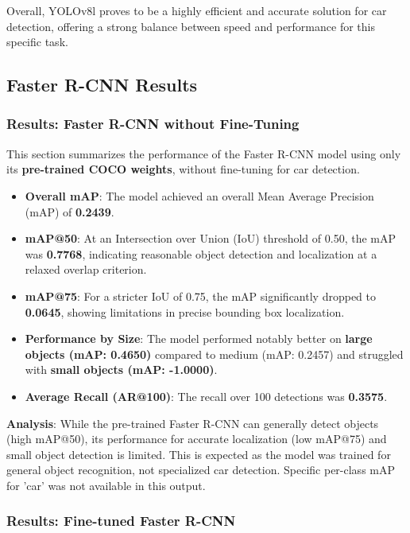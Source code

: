 \documentclass[conference]{IEEEtran}
\begin{document}
Overall, YOLOv8l proves to be a highly efficient and accurate solution for car detection, offering a strong balance between speed and performance for this specific task.

\subsection{Faster R-CNN Results}
\label{ssec:fasterrcnn_results_overall} 

\subsubsection{Results: Faster R-CNN without Fine-Tuning}
\label{ssec:results_fasterrcnn_pretrained}

This section summarizes the performance of the Faster R-CNN model using only its \textbf{pre-trained COCO weights}, without fine-tuning for car detection.

\begin{itemize}
    \item \textbf{Overall mAP}: The model achieved an overall Mean Average Precision (mAP) of \textbf{0.2439}.
    \item \textbf{mAP@50}: At an Intersection over Union (IoU) threshold of 0.50, the mAP was \textbf{0.7768}, indicating reasonable object detection and localization at a relaxed overlap criterion.
    \item \textbf{mAP@75}: For a stricter IoU of 0.75, the mAP significantly dropped to \textbf{0.0645}, showing limitations in precise bounding box localization.
    \item \textbf{Performance by Size}: The model performed notably better on \textbf{large objects (mAP: 0.4650)} compared to medium (mAP: 0.2457) and struggled with \textbf{small objects (mAP: -1.0000)}.
    \item \textbf{Average Recall (AR@100)}: The recall over 100 detections was \textbf{0.3575}.
\end{itemize}

\textbf{Analysis}: While the pre-trained Faster R-CNN can generally detect objects (high mAP@50), its performance for accurate localization (low mAP@75) and small object detection is limited. This is expected as the model was trained for general object recognition, not specialized car detection. Specific per-class mAP for 'car' was not available in this output.

\subsubsection{Results: Fine-tuned Faster R-CNN}
\label{ssec:results_fasterrcnn_finetuned}
\end{document}
